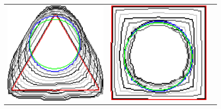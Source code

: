 \begin{figure}[]
\center
\begin{tabular}{ccc}
\includegraphics[scale=0.25]{figures/chapter5/flow/triangle/radius_5/ii/selastica/len_pen_0.01000/jonctions_1/curve_segs_4/best/gs_0.25000/summary.pdf} &
\includegraphics[scale=0.25]{figures/chapter5/flow/square/radius_5/ii/selastica/len_pen_0.01000/jonctions_1/curve_segs_4/best/gs_0.25000/summary.pdf} &

\end{tabular}
\end{figure}
